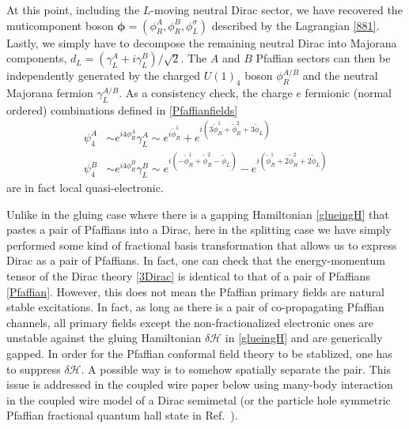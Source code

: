 At this point, including the $L$-moving neutral Dirac sector, we have recovered the muticomponent boson $\boldsymbol\phi=(\phi^A_R,\phi^B_R,\phi^\sigma_L)$ described by the Lagrangian \eqref{881}. Lastly, we simply have to decompose the remaining neutral Dirac into Majorana components, $d_L=(\gamma^A_L+i\gamma^B_L)/\sqrt{2}$. The $A$ and $B$ Pfaffian sectors can then be independently generated by the charged $U(1)_4$ boson $\phi^{A/B}_R$ and the neutral Majorana fermion $\gamma^{A/B}_L$. As a consistency check, the charge $e$ fermionic (normal ordered) combinations defined in \eqref{Pfaffianfields} \begin{align}\psi_4^A&\sim e^{i4\phi^A_R}\gamma_L^A\sim e^{i\tilde\phi^1_R}+e^{i(3\tilde\phi^1_R+\tilde\phi^2_R+3\tilde\phi_L)}\label{psi4def1}\\\psi_4^B&\sim e^{i4\phi^B_R}\gamma_L^B\sim e^{i(-\tilde\phi^1_R+\tilde\phi^2_R-\tilde\phi_L)}-e^{i(\tilde\phi^1_R+2\tilde\phi^2_R+2\tilde\phi_L)}\nonumber\end{align} are in fact local quasi-electronic. %

Unlike in the gluing case where there is a gapping Hamiltonian \eqref{glueingH} that pastes a pair of Pfaffians into a Dirac, here in the splitting case we have simply performed some kind of fractional basis transformation that allows us to express Dirac as a pair of Pfaffians. In fact, one can check that the energy-momentum tensor of the Dirac theory \eqref{3Dirac} is identical to that of a pair of Pfaffians \eqref{Pfaffian}. However, this does not mean the Pfaffian primary fields are natural stable excitations. In fact, as long as there is a pair of co-propagating Pfaffian channels, all primary fields except the non-fractionalized electronic ones are unstable against the gluing Hamiltonian $\delta\mathcal{H}$ in \eqref{glueingH} and are generically gapped. In order for the Pfaffian conformal field theory to be stablized, one has to suppress $\delta\mathcal{H}$. A possible way is to somehow spatially separate the pair. This issue is addressed in the coupled wire paper below using many-body interaction in the coupled wire model of a Dirac semimetal (or the particle hole symmetric Pfaffian fractional quantum hall state in Ref.~).




